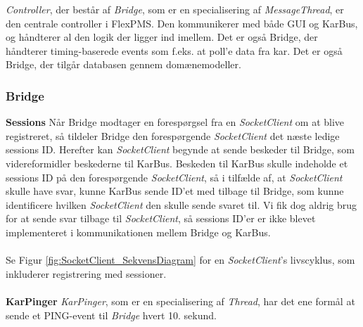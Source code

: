 \textit{Controller}, der består af \textit{Bridge}, som er en specialisering af \textit{MessageThread}, er den centrale controller i FlexPMS. Den kommunikerer med både GUI og KarBus, og håndterer al den logik der ligger ind imellem. Det er også Bridge, der håndterer timing-baserede events som f.eks. at poll'e data fra kar. Det er også Bridge, der tilgår databasen gennem domænemodeller.


\subsubsection{Bridge}


\textbf{Sessions}
Når Bridge modtager en forespørgsel fra en \textit{SocketClient} om at blive registreret, så tildeler Bridge den forespørgende \textit{SocketClient} det næste ledige sessions ID. Herefter kan \textit{SocketClient} begynde at sende beskeder til Bridge, som videreformidler beskederne til KarBus. Beskeden til KarBus skulle indeholde et sessions ID på den forespørgende \textit{SocketClient}, så i tilfælde af, at \textit{SocketClient} skulle have svar, kunne KarBus sende ID’et med tilbage til Bridge, som kunne identificere hvilken \textit{SocketClient} den skulle sende svaret til. Vi fik dog aldrig brug for at sende svar tilbage til \textit{SocketClient}, så sessions ID'er er ikke blevet implementeret i kommunikationen mellem Bridge og KarBus.\\\\

Se Figur \ref{fig:SocketClient_SekvensDiagram} for en \textit{SocketClient}'s livscyklus, som inkluderer registrering med sessioner.\\\\

\textbf{KarPinger}
\textit{KarPinger}, som er en specialisering af \textit{Thread}, har det ene formål at sende et PING-event til \textit{Bridge} hvert 10. sekund.
